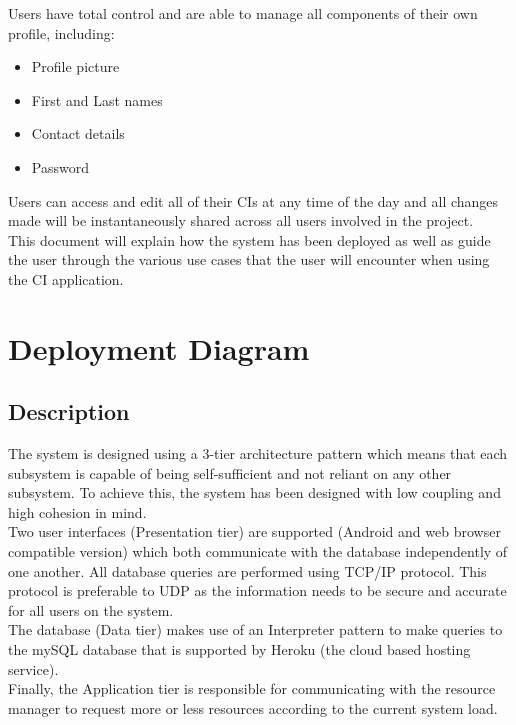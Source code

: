 \documentclass[11pt]{article}
\begin{document}
\begin{flushleft}
Users have total control and are able to manage all components of their own profile, including:
\begin{itemize}
    \item Profile picture
    \item First and Last names
    \item Contact details
    \item Password
\end{itemize}

Users can access and edit all of their CIs at any time of the day and all changes made will be instantaneously shared across all users involved in the project.\\[0.5cm]

This document will explain how the system has been deployed as well as guide the user through the various use cases that the user will encounter when using the CI application.\\[0.5cm]
\end{flushleft}

\newpage

\section{Deployment Diagram}
    \subsection{Description}
    The system is designed using a 3-tier architecture pattern which means that each subsystem is capable of being self-sufficient and not reliant on any other subsystem. To achieve this, the system has been designed with low coupling and high cohesion in mind.\\[0.5cm]
    Two user interfaces (Presentation tier) are supported (Android and web browser compatible version) which both communicate with the database independently of one another. All database queries are performed using TCP/IP protocol. This protocol is preferable to UDP as the information needs to be secure and accurate for all users on the system.\\[0.5cm]
    The database (Data tier) makes use of an Interpreter pattern to make queries to the mySQL database that is supported by Heroku (the cloud based hosting service).\\[0.5cm]
    Finally, the Application tier is responsible for communicating with the resource manager to request more or less resources according to the current system load.\\[0.5cm]
\end{document}
